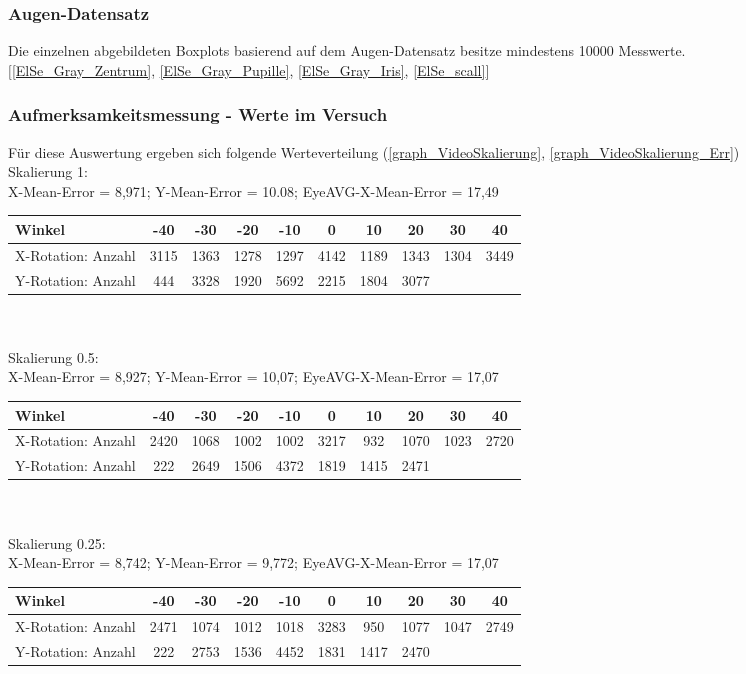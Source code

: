 \subsubsection*{Augen-Datensatz \cite{database_Eye}}
Die einzelnen abgebildeten Boxplots basierend auf dem Augen-Datensatz \cite{database_Eye} besitze mindestens 10000 Messwerte.\\
$[$\autoref{ElSe_Gray_Zentrum}, \autoref{ElSe_Gray_Pupille}, \autoref{ElSe_Gray_Iris}, \autoref{ElSe_scall}$]$
\subsubsection*{Aufmerksamkeitsmessung - Werte im Versuch}
Für diese Auswertung ergeben sich folgende Werteverteilung (\autoref{graph_VideoSkalierung}, \autoref{graph_VideoSkalierung_Err})\\
Skalierung 1:\\
X-Mean-Error = 8,971; Y-Mean-Error = 10.08; EyeAVG-X-Mean-Error = 17,49\\
\begin{tabular}{|l|c|c|c|c|c|c|c|c|c|}
	\hline 
	Winkel&-40&-30&-20&-10&0&10&20&30&40\\
	\hline 
	X-Rotation: Anzahl&3115&1363&1278&1297&4142&1189&1343&1304&3449\\ 
	\hline 
	Y-Rotation: Anzahl&444&3328&1920&5692&2215&1804&3077&&\\
	\hline
\end{tabular}\\\\
Skalierung 0.5:\\
X-Mean-Error = 8,927; Y-Mean-Error = 10,07; EyeAVG-X-Mean-Error = 17,07\\
\begin{tabular}{|l|c|c|c|c|c|c|c|c|c|}
	\hline 
	Winkel&-40&-30&-20&-10&0&10&20&30&40\\
	\hline 
	X-Rotation: Anzahl&2420&1068&1002&1002&3217&932&1070&1023&2720\\ 
	\hline 
	Y-Rotation: Anzahl&222&2649&1506&4372&1819&1415&2471&&\\
	\hline
\end{tabular}\\\\
Skalierung 0.25:\\
X-Mean-Error = 8,742; Y-Mean-Error = 9,772; EyeAVG-X-Mean-Error = 17,07\\
\begin{tabular}{|l|c|c|c|c|c|c|c|c|c|}
\hline 
Winkel&-40&-30&-20&-10&0&10&20&30&40\\
\hline 
X-Rotation: Anzahl&2471&1074&1012&1018&3283&950&1077&1047&2749\\ 
\hline 
Y-Rotation: Anzahl&222&2753&1536&4452&1831&1417&2470&&\\
\hline
\end{tabular}\\\\
